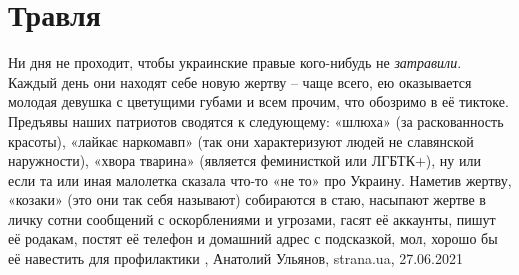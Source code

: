  
 
 
 
 
\chapter{Травля}

Ни дня не проходит, чтобы украинские правые кого-нибудь не \emph{затравили}. Каждый
день они находят себе новую жертву – чаще всего, ею оказывается молодая девушка
с цветущими губами и всем прочим, что обозримо в её тиктоке.  Предъявы наших
патриотов сводятся к следующему: «шлюха» (за раскованность красоты), «лайкає
наркомавп» (так они характеризуют людей не славянской наружности), «хвора
тварина» (является феминисткой или ЛГБТК+), ну или если та или иная малолетка
сказала что-то «не то» про Украину.  Наметив жертву, «козаки» (это они так себя
называют) собираются в стаю, насыпают жертве в личку сотни сообщений с
оскорблениями и угрозами, гасят её аккаунты, пишут её родакам, постят её
телефон и домашний адрес с подсказкой, мол, хорошо бы её навестить для
профилактики
, 
Анатолий Ульянов, strana.ua, 27.06.2021
